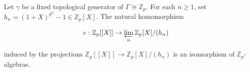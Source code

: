 Let $\gamma$ be a fixed topological generator of $\Gamma \cong \mathbb{Z}_p$. For each $n \geq 1$, set $h_n = (1 + X)^{p^n} - 1 \in \mathbb{Z}_p[X]$. The natural homomorphism

$$e: \mathbb{Z}_p[[X]] \to \varprojlim_n \mathbb{Z}_p[X]/(h_n)$$

induced by the projections $\mathbb{Z}_p[[X]] \to \mathbb{Z}_p[X]/(h_n)$ is an isomorphism of $\mathbb{Z}_p$-algebras.
